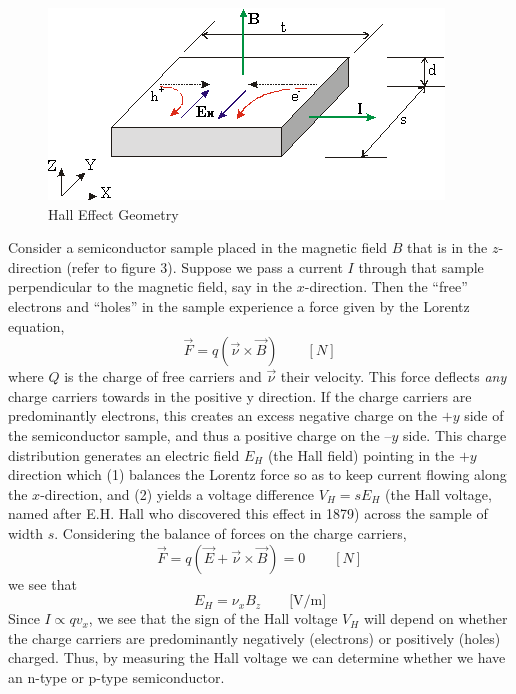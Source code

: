 \documentclass{../lab}
\begin{document}
\begin{figure}
    \centering
    \includegraphics[width=0.5\linewidth]{images/HallEffectGeometry.png}
    \caption{Hall Effect Geometry}
\end{figure}

Consider a semiconductor sample placed in the magnetic field $B$ that is in the $z$-direction (refer to figure 3). Suppose we pass a current $I$ through that sample perpendicular to the magnetic field, say in the $x$-direction. Then the ``free'' electrons and ``holes'' in the sample experience a force given by the Lorentz equation,
\begin{equation}
    \vec{F} = q (\vec{\nu} \times \vec{B}) \qquad [N]
\end{equation}
where $Q$ is the charge of free carriers and $\vec{\nu}$ their velocity. This force deflects \emph{any} charge carriers towards in the positive y direction. If the charge carriers are predominantly electrons, this creates an excess negative charge on the $+y$ side of the semiconductor sample, and thus a positive charge on the $–y$ side. This charge distribution generates an electric field $E_H$ (the Hall field) pointing in the $+y$ direction which (1) balances the Lorentz force so as to keep current flowing along the $x$-direction, and (2) yields a voltage difference $V_H = s E_H$ (the Hall voltage, named after E.H. Hall who discovered this effect in 1879) across the sample of width $s$. Considering the balance of forces on the charge carriers,
\begin{equation}
    \vec{F} = q (\vec{E} + \vec{\nu} \times \vec{B}) = 0 \qquad [N]
\end{equation}
we see that
\begin{equation}
    E_H = \nu_x B_z \qquad \textrm{[V/m]}
\end{equation}
Since $I \propto q v_x$, we see that the sign of the Hall voltage $V_H$ will depend on whether the charge carriers are predominantly negatively (electrons) or positively (holes) charged. Thus, by measuring the Hall voltage we can determine whether we have an n-type or p-type semiconductor.
\end{document}
